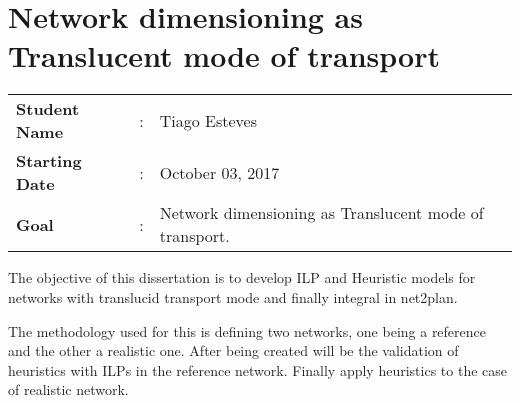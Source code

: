 \clearpage
\section{Network dimensioning as Translucent mode of transport}

\begin{tcolorbox}	
\begin{tabular}{p{2.75cm} p{0.2cm} p{10.5cm}} 	
\textbf{Student Name}  &:& Tiago Esteves\\
\textbf{Starting Date} &:& October 03, 2017\\
\textbf{Goal}          &:& Network dimensioning as Translucent mode of transport.
\end{tabular}
\end{tcolorbox}

The objective of this dissertation is to develop ILP and Heuristic models for networks with translucid transport mode and finally integral in net2plan.

The methodology used for this is defining two networks, one being a reference and the other a realistic one. After being created will be the validation of heuristics with ILPs in the reference network. Finally apply heuristics to the case of realistic network.

